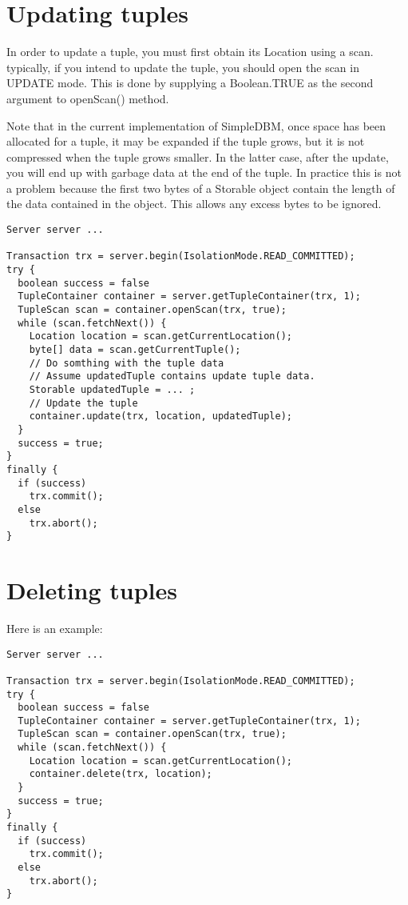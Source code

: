 \documentclass[a4paper,draft,oneside]{book}
\begin{document}
\section{Updating tuples}

In order to update a tuple, you must first obtain its Location using a
scan. typically, if you intend to update the tuple, you should open the
scan in UPDATE mode. This is done by supplying a Boolean.TRUE as the
second argument to openScan() method.

Note that in the current implementation of SimpleDBM, once space has been
allocated for a tuple, it may be expanded if the tuple grows, but it is not 
compressed when the tuple grows smaller. In the latter case, after the update,
you will end up with garbage data at the end of the tuple. In practice this
is not a problem because the first two bytes of a Storable object contain the
length of the data contained in the object. This allows any excess bytes to be
ignored. 

\begin{verbatim}
Server server ...

Transaction trx = server.begin(IsolationMode.READ_COMMITTED);
try {
  boolean success = false      
  TupleContainer container = server.getTupleContainer(trx, 1);
  TupleScan scan = container.openScan(trx, true);
  while (scan.fetchNext()) {
    Location location = scan.getCurrentLocation();
    byte[] data = scan.getCurrentTuple();
    // Do somthing with the tuple data
    // Assume updatedTuple contains update tuple data.
    Storable updatedTuple = ... ;
    // Update the tuple
    container.update(trx, location, updatedTuple);
  }
  success = true;
}
finally {
  if (success)
    trx.commit();
  else
    trx.abort();
}
\end{verbatim}

\section{Deleting tuples}

Here is an example:

\begin{verbatim}
Server server ...

Transaction trx = server.begin(IsolationMode.READ_COMMITTED);
try {
  boolean success = false      
  TupleContainer container = server.getTupleContainer(trx, 1);
  TupleScan scan = container.openScan(trx, true);
  while (scan.fetchNext()) {
    Location location = scan.getCurrentLocation();
    container.delete(trx, location);
  }
  success = true;
}
finally {
  if (success)
    trx.commit();
  else
    trx.abort();
}
\end{verbatim}
\end{document}
